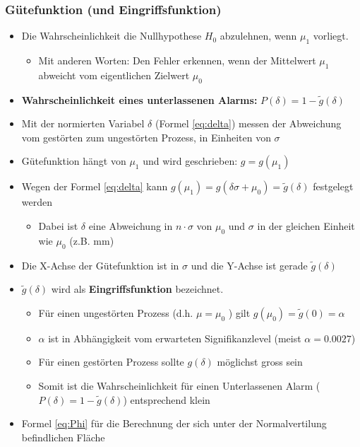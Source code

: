 \subsubsection{Gütefunktion (und Eingriffsfunktion)}
\label{subsubsec:Guetefunktion}
\begin{itemize}
	\item Die Wahrscheinlichkeit die Nullhypothese $H_0$ abzulehnen, wenn $\mu_1$ vorliegt. 
	\begin{itemize}
		\item Mit anderen Worten: Den Fehler erkennen, wenn der Mittelwert $\mu_1$ abweicht vom eigentlichen Zielwert $\mu_0$
	\end{itemize}
	\item \textbf{Wahrscheinlichkeit eines unterlassenen Alarms:} $P(\delta) = 1-\tilde{g}(\delta)$
	\item Mit der normierten Variabel $\delta$ (Formel \ref{eq:delta}) messen der Abweichung vom gestörten zum ungestörten Prozess, in Einheiten von $\sigma$
	\item Gütefunktion hängt von $\mu_1$ und wird geschrieben: $g=g(\mu_1)$
	\item Wegen der Formel \ref{eq:delta} kann $g(\mu_1) = g(\delta\sigma+\mu_0) = \tilde{g}(\delta)$ festgelegt werden 
	\begin{itemize}
		\item Dabei ist $\delta$ eine Abweichung in $n\cdot\sigma$ von $\mu_0$ und $\sigma$ in der gleichen Einheit wie $\mu_0$ (z.B. \si{\milli\meter})
	\end{itemize}
	\item Die X-Achse der Gütefunktion ist in $\sigma$ und die Y-Achse ist gerade $\tilde{g}(\delta)$ 
	\item $\tilde{g}(\delta)$ wird als \textbf{Eingriffsfunktion} bezeichnet. 
	\begin{itemize}
		\item Für einen ungestörten Prozess (d.h. $\mu=\mu_0$ ) gilt $g(\mu_0) = \tilde{g}(0) = \alpha$
		\item $\alpha$ ist in Abhängigkeit vom erwarteten Signifikanzlevel (meist $\alpha = 0.0027$)
		\item Für einen gestörten Prozess sollte $g(\delta)$ möglichst gross sein
		\item Somit ist die Wahrscheinlichkeit für einen Unterlassenen Alarm ($P(\delta)=1-\tilde{g}(\delta)$) entsprechend klein
	\end{itemize}
	\item Formel \ref{eq:Phi} für die Berechnung der sich unter der Normalvertilung befindlichen Fläche

\end{itemize}
